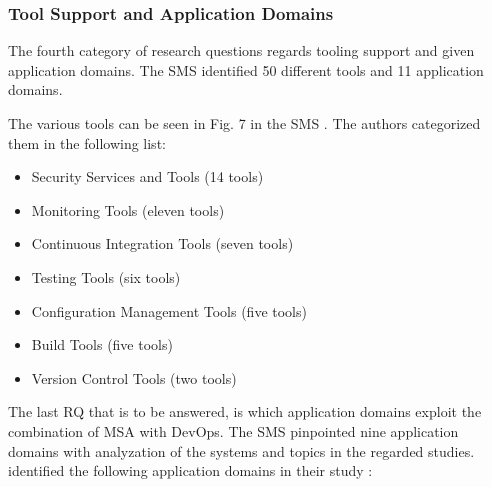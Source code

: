 \subsubsection{Tool Support and Application Domains}

The fourth category of research questions regards tooling support
and given application domains. The SMS identified 50 different tools and
11 application domains.

The various tools can be seen in Fig. 7 in the SMS \cite{waseem:SMSMSADevOps}.
The authors categorized them in the following list:

\begin{itemize}
    \item Security Services and Tools (14 tools)
    \item Monitoring Tools (eleven tools)
    \item Continuous Integration Tools (seven tools)
    \item Testing Tools (six tools)
    \item Configuration Management Tools (five tools)
    \item Build Tools (five tools)
    \item Version Control Tools (two tools)
\end{itemize}

The last RQ that is to be answered, is which application domains
exploit the combination of MSA with DevOps. The SMS pinpointed nine
application domains with analyzation of the systems and topics
in the regarded studies. \smsAuthors identified the following
application domains in their study \cite{waseem:SMSMSADevOps}:

